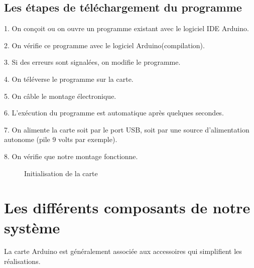 \documentclass[12pt, openany]{report}
\begin{document}
         		 \subsection{Les étapes de téléchargement du programme }
         		 1. On conçoit ou on ouvre un programme existant avec le logiciel IDE Arduino.
         		
         		 2. On vérifie ce programme avec le logiciel Arduino(compilation).
         		
         		 3. Si des erreurs sont signalées, on modifie le programme.
         		
         		 4. On téléverse le programme sur la carte.
         		
         		 5. On câble le montage électronique.
         		
         		 6. L'exécution du programme est automatique après quelques secondes.
         		
         		 7. On alimente la carte soit par le port USB, soit par une source d'alimentation autonome
         		 (pile 9 volts par exemple).
         		
         		 8. On vérifie que notre montage fonctionne.
      \begin{figure}[!h]
                     \centering
     
              \caption{Initialisation de la carte }
                    		          		
                    		          		 \end{figure}
                \newpage		       		 		
         		
        \section{Les différents composants de notre système}
  La carte Arduino est généralement associée aux accessoires qui simplifient les réalisations.
\end{document}
